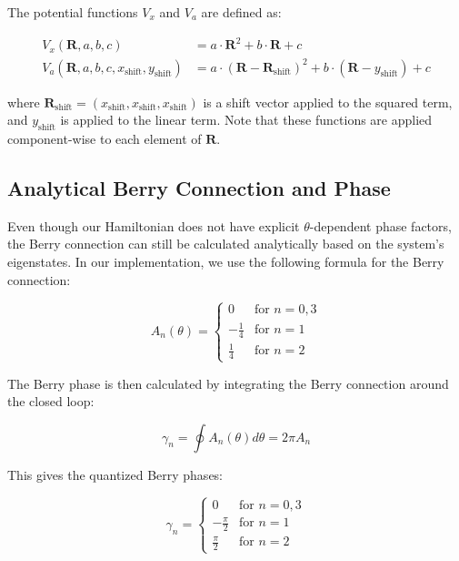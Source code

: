 \documentclass[12pt,a4paper]{article}
\begin{document}
The potential functions $V_x$ and $V_a$ are defined as:

\begin{align}
V_x(\bm{R}, a, b, c) &= a \cdot \bm{R}^2 + b \cdot \bm{R} + c \\
V_a(\bm{R}, a, b, c, x_{\text{shift}}, y_{\text{shift}}) &= a \cdot (\bm{R} - \bm{R}_{\text{shift}})^2 + b \cdot (\bm{R} - y_{\text{shift}}) + c
\end{align}

where $\bm{R}_{\text{shift}} = (x_{\text{shift}}, x_{\text{shift}}, x_{\text{shift}})$ is a shift vector applied to the squared term, and $y_{\text{shift}}$ is applied to the linear term. Note that these functions are applied component-wise to each element of $\bm{R}$.

\subsection{Analytical Berry Connection and Phase}

Even though our Hamiltonian does not have explicit $\theta$-dependent phase factors, the Berry connection can still be calculated analytically based on the system's eigenstates. In our implementation, we use the following formula for the Berry connection:

\begin{equation}
A_n(\theta) = \begin{cases}
0 & \text{for } n = 0, 3 \\
-\frac{1}{4} & \text{for } n = 1 \\
\frac{1}{4} & \text{for } n = 2
\end{cases}
\end{equation}

The Berry phase is then calculated by integrating the Berry connection around the closed loop:

\begin{equation}
\gamma_n = \oint A_n(\theta) d\theta = 2\pi A_n
\end{equation}

This gives the quantized Berry phases:

\begin{equation}
\gamma_n = \begin{cases}
0 & \text{for } n = 0, 3 \\
-\frac{\pi}{2} & \text{for } n = 1 \\
\frac{\pi}{2} & \text{for } n = 2
\end{cases}
\end{equation}
\end{document}
